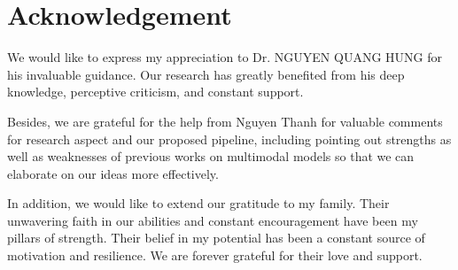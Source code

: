 \chapter*{Acknowledgement}

We would like to express my appreciation to Dr. NGUYEN QUANG HUNG for his invaluable guidance. Our research has greatly benefited from his deep knowledge, perceptive criticism, and constant support.

Besides, we are grateful for the help from Nguyen Thanh for valuable comments for research aspect and our proposed pipeline, including pointing out strengths as well as weaknesses of previous works on multimodal models so that we can elaborate on our ideas more effectively.

In addition, we would like to extend our gratitude to my family. Their unwavering faith in our abilities and constant encouragement have been my pillars of strength. Their belief in my potential has been a constant source of motivation and resilience. We are forever grateful for their love and support.
